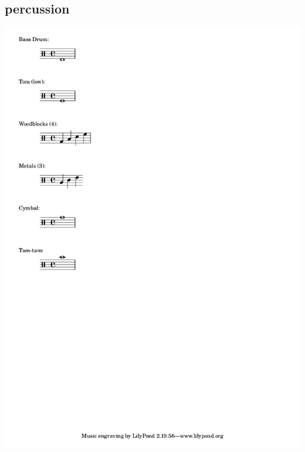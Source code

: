 \documentclass[12pt]{book}
\begin{document}
\begin{multicols}{3}
\subsection{percussion}
\includegraphics[scale=0.7, clip, trim=0 2cm 10cm 0 ]{../../../../reference/perc-setup.png}
\end{multicols}
\newpage
\null
\thispagestyle{blank}
\newpage
\end{document}
